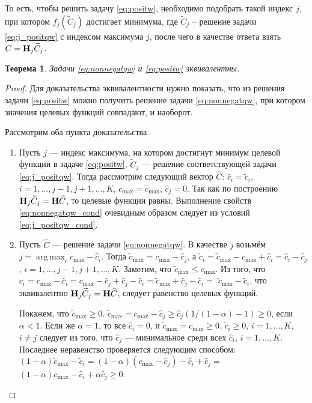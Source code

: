 \documentclass[12pt,a4paper]{article}
\DeclareMathOperator*{\argmax}{arg\,max}
\newtheorem{theorem}{Теорема}
\begin{document}
То есть, чтобы решить задачу \ref{eq:positw}, необходимо подобрать такой индекс $j$, при котором $f_j(\widetilde C_j)$ достигает минимума, где $\widetilde C_j$ -- решение задачи \eqref{eq:j_positqw} с индексом максимума $j$, после чего в качестве ответа взять $C = \mathbf{H}_j \widetilde C_j$.
\begin{theorem} \label{th:eqivqw}
	Задачи \eqref{eq:nonnegatqw} и \eqref{eq:positw} эквивалентны.
\end{theorem}
\begin{proof}
	Для доказательства эквивалентности нужно показать, что из решения задачи \eqref{eq:positw} можно получить решение задачи \eqref{eq:nonnegatqw}, при котором значения целевых функций совпадают, и наоборот.
	
	Рассмотрим оба пункта доказательства.
	\begin{enumerate}
		\item Пусть $j$ --- индекс максимума, на котором достигнут минимум целевой функции в задаче \eqref{eq:positw}, $\widetilde C_j$ --- решение соответствующей задачи \eqref{eq:j_positqw}. Тогда рассмотрим следующий вектор $\widehat C$: $\hat c_i = \tilde c_i$, $i = 1, \ldots, j-1, j+1, \ldots, K$, $c_\text{max} = \tilde c_\text{max}$, $\hat c_j = 0$. Так как по построению $\mathbf{H}_j \widetilde C_j = \mathbf{H} \widehat C$, то целевые функции равны. Выполнение свойств \eqref{eq:nonnegatqw_cond} очевидным образом следует из условий \eqref{eq:j_positqw_cond}.
		\item Пусть $\widehat C$ --- решение задачи \eqref{eq:nonnegatqw}. В качестве $j$ возьмём $j = \argmax_i c_\text{max} - \hat c_i$. Тогда $\tilde c_\text{max} = c_\text{max} - \hat c_j$, а $\tilde c_i = \tilde c_\text{max} - c_\text{max} + \hat c_i = \hat c_i - \hat c_j$, $i = 1, \ldots, j-1, j+1, \ldots, K$. Заметим, что $\tilde c_\text{max} \le c_\text{max}$. Из того, что $c_i = c_\text{max} - \hat c_i = c_\text{max} - \hat c_j + \hat c_j - \hat c_i = \tilde c_\text{max} + \hat c_j - \hat c_i =$ $\tilde c_\text{max} - \tilde c_i$, что эквивалентно $\mathbf{H}_j \widetilde C_j = \mathbf{H} \widehat C$, следует равенство целевых функций.
		
		Покажем, что $\tilde c_\text{max} \ge 0$. $\tilde c_\text{max} = c_\text{max} - \hat c_j \ge \hat c_j (1/(1 - \alpha) - 1) \ge 0$, если $\alpha < 1$. Если же $\alpha = 1$, то все $\hat c_i = 0$, и $\tilde c_\text{max} = c_\text{max} \ge 0$. $\tilde c_i \ge 0$, $i = 1, \ldots, K$, $i \neq j$ следует из того, что $\hat c_j$ --- минимальное среди всех $\hat c_i$, $i = 1, \ldots, K$. Последнее неравенство проверяется следующим способом: $(1 - \alpha) \tilde c_\text{max} - \tilde c_i = (1 - \alpha)(c_\text{max} - \hat c_j) - \hat c_i + \hat c_j = $ $(1 - \alpha)c_\text{max} - \hat c_i + \alpha \hat c_j \ge 0$.
	\end{enumerate}
\end{proof}
\end{document}
